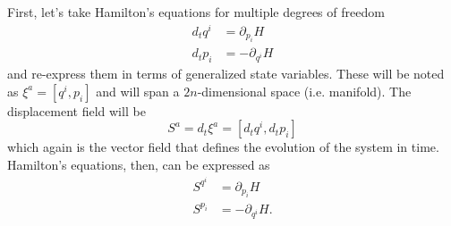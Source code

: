 First, let's take Hamilton's equations for multiple degrees of freedom
\begin{equation}\label{rp-cm-hm-condNEquations}
	\tag{HM-ND}
	\begin{aligned}
		d_t q^i &= \partial_{p_i} H \\
		d_t p_i &= - \partial_{q^i} H
	\end{aligned}
\end{equation}
and re-express them in terms of generalized state variables. These will be noted as $\xi^a = [q^i, p_i]$ and will span a $2n$-dimensional space (i.e. manifold). The displacement field will be
\begin{equation}\label{rp-cm-displacementNd}
	S^a = d_t \xi^a = [d_t q^i, d_t p_i]
\end{equation}
which again is the vector field that defines the evolution of the system in time. Hamilton's equations, then, can be expressed as
\begin{equation}
	\begin{aligned}
		S^{q^i} &= \partial_{p_i} H \\
		S^{p_i} &= - \partial_{q^i} H.
	\end{aligned}
\end{equation}

